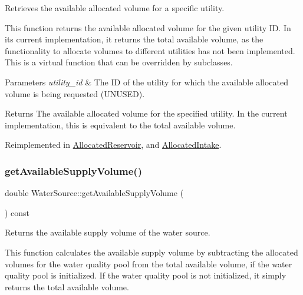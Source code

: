 Retrieves the available allocated volume for a specific utility. 

This function returns the available allocated volume for the given utility ID. In its current implementation, it returns the total available volume, as the functionality to allocate volumes to different utilities has not been implemented. This is a virtual function that can be overridden by subclasses.


\begin{DoxyParams}{Parameters}
{\em utility\+\_\+id} & The ID of the utility for which the available allocated volume is being requested (U\+N\+U\+S\+ED).\\
\hline
\end{DoxyParams}
\begin{DoxyReturn}{Returns}
The available allocated volume for the specified utility. In the current implementation, this is equivalent to the total available volume. 
\end{DoxyReturn}


Reimplemented in \mbox{\hyperlink{classAllocatedReservoir_ae161ebfc285aa69cb8b7f4fe20ee7a2e}{Allocated\+Reservoir}}, and \mbox{\hyperlink{classAllocatedIntake_a9c6161b8dd13b6ea70a9dafbb72afc91}{Allocated\+Intake}}.

\mbox{\label{classWaterSource_af6445a2dd3764907bcb9a37d4647f910}} 
\subsubsection{\texorpdfstring{get\+Available\+Supply\+Volume()}{getAvailableSupplyVolume()}}
{\footnotesize\ttfamily double Water\+Source\+::get\+Available\+Supply\+Volume (\begin{DoxyParamCaption}{ }\end{DoxyParamCaption}) const}



Returns the available supply volume of the water source. 

This function calculates the available supply volume by subtracting the allocated volumes for the water quality pool from the total available volume, if the water quality pool is initialized. If the water quality pool is not initialized, it simply returns the total available volume.

